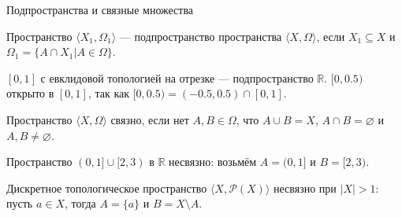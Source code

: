 \documentclass[aspectratio=169]{beamer}
\begin{document}
\begin{frame}{Подпространства и связные множества}
\begin{defrus}Пространство $\langle X_1, \Omega_1\rangle$ --- подпространство пространства $\langle X, \Omega\rangle$,
если $X_1 \subseteq X$ и $\Omega_1 = \{ A\cap X_1 | A \in \Omega\}$.
\end{defrus}
\begin{exmprus} $[0,1]$ с евклидовой топологией на отрезке --- подпространство $\mathbb{R}$.
$[0,0.5)$ открыто в $[0,1]$, так как $[0,0.5) = (-0.5,0.5) \cap [0,1]$.\end{exmprus}

\begin{defrus}Пространство $\langle X, \Omega\rangle$ связно, если нет $A,B \in \Omega$, что $A\cup B = X$,
$A \cap B = \varnothing$ и $A,B \ne \varnothing$.\end{defrus}

\begin{exmprus}Пространство $(0,1]\cup[2,3)$ в $\mathbb{R}$ несвязно: возьмём $A=(0,1]$ и $B = [2,3)$.

Дискретное топологическое пространство $\langle X, \mathcal{P}(X)\rangle$ несвязно при $|X| > 1$: пусть $a \in X$, 
тогда $A = \{a\}$ и $B = X \setminus A$.
\end{exmprus}
\end{frame}
\end{document}
